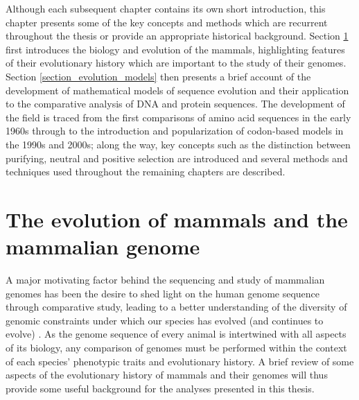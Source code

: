 Although each subsequent chapter contains its own short introduction,
this chapter presents some of the key concepts and methods which are
recurrent throughout the thesis or provide an appropriate historical
background. Section \ref{section_mammal_evolution} first introduces
the biology and evolution of the mammals, highlighting features of
their evolutionary history which are important to the study of their
genomes. Section \ref{section_evolution_models} then presents a brief
account of the development of mathematical models of sequence
evolution and their application to the comparative analysis of DNA and
protein sequences. The development of the field is traced from the
first comparisons of amino acid sequences in the early 1960s through
to the introduction and popularization of codon-based models in the
1990s and 2000s; along the way, key concepts such as the distinction
between purifying, neutral and positive selection are introduced and
several methods and techniques used throughout the remaining chapters
are described.

\section{The evolution of mammals and the mammalian genome}
\label{section_mammal_evolution}

A major motivating factor behind the sequencing and study of mammalian
genomes has been the desire to shed light on the human genome sequence
through comparative study, leading to a better understanding of the
diversity of genomic constraints under which our species has evolved
(and continues to evolve) \citep{Mouse2002Initial}. As the genome
sequence of every animal is intertwined with all aspects of its
biology, any comparison of genomes must be performed within the
context of each species' phenotypic traits and evolutionary history. A
brief review of some aspects of the evolutionary history of mammals
and their genomes will thus provide some useful background for the
analyses presented in this thesis.

